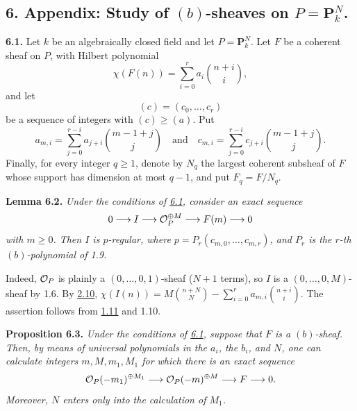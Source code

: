 
\subsection*{6. Appendix: Study of $(b)$-sheaves on $P=\mathbf P^N_k$.}

\textbf{6.1.} Let $k$ be an algebraically closed field and let $P=\mathbf P^N_k$. Let $F$ be a coherent sheaf on $P$, with Hilbert polynomial
\[
  \chi(F(n))=\sum_{i=0}^{r}a_i\binom{n+i}{i},
\]
and let
\[
  (c)=(c_0,\ldots,c_r)
\]
be a sequence of integers with $(c)\geq(a)$. Put
\[
  a_{m,i}=\sum_{j=0}^{r-i}a_{j+i}\binom{m-1+j}{j}
  \quad\text{and}\quad
  c_{m,i}=\sum_{j=0}^{r-i}c_{j+i}\binom{m-1+j}{j}.
\]
Finally, for every integer $q\geq1$, denote by $N_q$ the largest coherent subsheaf of $F$ whose support has dimension at most $q-1$, and put $F_q=F/N_q$.

\textbf{Lemma 6.2.} \emph{Under the conditions of \hyperlink{sga6.e13.para.6-1}{6.1}, consider an exact sequence
\[
  0\longrightarrow I\longrightarrow\mathcal O_P^{\oplus M}
  \longrightarrow F(m)\longrightarrow0
\]
with $m\geq0$. Then $I$ is $p$-regular, where
\(p=P_r(c_{m,0},\ldots,c_{m,r})\), and $P_r$ is the $r$-th
$(b)$-polynomial of 1.9.}

Indeed, $\mathcal O_P$ is plainly a $(0,\ldots,0,1)$-sheaf ($N+1$ terms), so
$I$ is a $(0,\ldots,0,M)$-sheaf by 1.6. By \hyperlink{sga6.e13.rem.2-10}{2.10},
\(\chi(I(n))=M\binom{n+N}{N}
-\sum_{i=0}^{r}a_{m,i}\binom{n+i}{i}\). The assertion follows from
\hyperlink{sga6.e13.thm.1-11}{1.11} and 1.10.

\textbf{Proposition 6.3.} \emph{Under the conditions of \hyperlink{sga6.e13.para.6-1}{6.1}, suppose that $F$ is a $(b)$-sheaf. Then, by means of universal polynomials in the $a_i$, the $b_i$, and $N$, one can calculate integers $m,M,m_1,M_1$ for which there is an exact sequence
\[
  \mathcal O_P(-m_1)^{\oplus M_1}\longrightarrow
  \mathcal O_P(-m)^{\oplus M}\longrightarrow F\longrightarrow0.
\]
Moreover, $N$ enters only into the calculation of $M_1$.}

